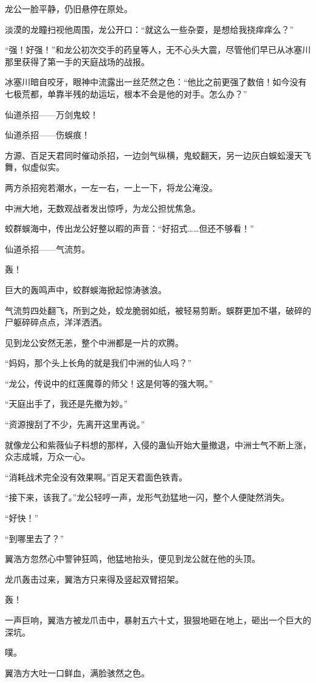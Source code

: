 \begin{this_body}
龙公一脸平静，仍旧悬停在原处。

淡漠的龙瞳扫视他周围，龙公开口：“就这么一些杂耍，是想给我挠痒痒么？”

“强！好强！”和龙公初次交手的药皇等人，无不心头大震，尽管他们早已从冰塞川那里获得了第一手的天庭战场的战报。

冰塞川暗自咬牙，眼神中流露出一丝茫然之色：“他比之前更强了数倍！如今没有七极荒都，单靠半残的劫运坛，根本不会是他的对手。怎么办？”

仙道杀招——万剑鬼蛟！

仙道杀招——伤蜈痕！

方源、百足天君同时催动杀招，一边剑气纵横，鬼蛟翻天，另一边灰白蜈蚣漫天飞舞，似虚似实。

两方杀招宛若潮水，一左一右，一上一下，将龙公淹没。

中洲大地，无数观战者发出惊呼，为龙公担忧焦急。

蛟群蜈海中，传出龙公好整以暇的声音：“好招式……但还不够看！”

仙道杀招——气流剪。

轰！

巨大的轰鸣声中，蛟群蜈海掀起惊涛骇浪。

气流剪四处翻飞，所到之处，蛟龙脆弱如纸，被轻易剪断。蜈群更加不堪，破碎的尸躯碎碎点点，洋洋洒洒。

见到龙公安然无恙，整个中洲都是一片的欢腾。

“妈妈，那个头上长角的就是我们中洲的仙人吗？”

“龙公，传说中的红莲魔尊的师父！这是何等的强大啊。”

“天庭出手了，我还是先撤为妙。”

“资源搜刮了不少，先离开这里再说。”

就像龙公和紫薇仙子料想的那样，入侵的蛊仙开始大量撤退，中洲士气不断上涨，众志成城，万众一心。

“消耗战术完全没有效果啊。”百足天君面色铁青。

“接下来，该我了。”龙公轻哼一声，龙形气劲猛地一闪，整个人便陡然消失。

“好快！”

“到哪里去了？”

翼浩方忽然心中警钟狂鸣，他猛地抬头，便见到龙公就在他的头顶。

龙爪轰击过来，翼浩方只来得及竖起双臂招架。

轰！

一声巨响，翼浩方被龙爪击中，暴射五六十丈，狠狠地砸在地上，砸出一个巨大的深坑。

噗。

翼浩方大吐一口鲜血，满脸骇然之色。


\end{this_body}
